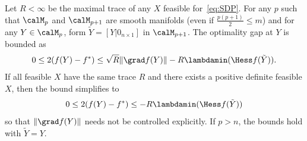 \documentclass{article}
\newcommand{\1}{\mathbf{1}}
\begin{document}
\begin{theorem} \label{thm:approxtolerance} %
	Let $R < \infty$ be the maximal trace of any $X$ feasible for~\eqref{eq:SDP}.
	For any $p$ such that $\calM_p$ and $\calM_{p+1}$ are smooth manifolds (even if $\frac{p(p+1)}{2} \leq m$) and for any $Y\in\calM_p$, form $\tilde Y = \left[ Y | 0_{n\times 1} \right]$ in $\calM_{p+1}$. The optimality gap at $Y$ is bounded as
	\begin{align}
		0 \leq 2(f(Y)-f^*) \leq \sqrt{R} \|\grad f(Y)\| - R \lambdamin(\Hess f(\tilde Y)).
		\label{eq:lambdaminbound}
	\end{align}
	If all feasible $X$ have the same trace $R$ and there exists a positive definite feasible $X$, then the bound simplifies to
	\begin{align}
		0 \leq 2(f(Y)-f^*) \leq - R \lambdamin(\Hess f(\tilde Y))
	\end{align}
	so that $\|\grad f(Y)\|$ needs not be controlled explicitly.
	If $p>n$, the bounds hold with $\tilde Y = Y$.
\end{theorem}
\end{document}
